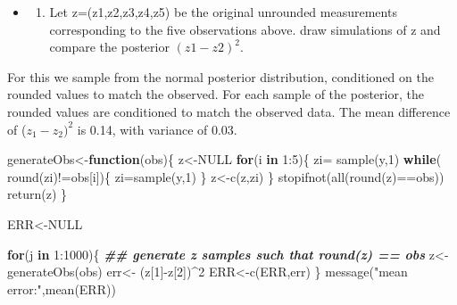 \documentclass[
]{book}
\newenvironment{Shaded}{\begin{snugshade}}{\end{snugshade}}
\newcommand{\ConstantTok}[1]{\textcolor[rgb]{0.00,0.00,0.00}{#1}}
\newcommand{\ControlFlowTok}[1]{\textcolor[rgb]{0.13,0.29,0.53}{\textbf{#1}}}
\newcommand{\DecValTok}[1]{\textcolor[rgb]{0.00,0.00,0.81}{#1}}
\newcommand{\DocumentationTok}[1]{\textcolor[rgb]{0.56,0.35,0.01}{\textbf{\textit{#1}}}}
\newcommand{\FunctionTok}[1]{\textcolor[rgb]{0.00,0.00,0.00}{#1}}
\newcommand{\NormalTok}[1]{#1}
\newcommand{\OtherTok}[1]{\textcolor[rgb]{0.56,0.35,0.01}{#1}}
\newcommand{\SpecialCharTok}[1]{\textcolor[rgb]{0.00,0.00,0.00}{#1}}
\newcommand{\StringTok}[1]{\textcolor[rgb]{0.31,0.60,0.02}{#1}}
\providecommand{\tightlist}{%
  \setlength{\itemsep}{0pt}\setlength{\parskip}{0pt}}
\theoremstyle{definition}
\theoremstyle{definition}
\theoremstyle{definition}
\theoremstyle{definition}
\theoremstyle{remark}
\begin{document}
\begin{itemize}
\item
  \begin{enumerate}
  \def\labelenumi{(\alph{enumi})}
  \setcounter{enumi}{3}
  \tightlist
  \item
    Let z=(z1,z2,z3,z4,z5) be the original unrounded measurements corresponding to the five observations above. draw simulations of z and compare the posterior \((z1-z2)^2\).
  \end{enumerate}
\end{itemize}

For this we sample from the normal posterior distribution, conditioned on the rounded values to match the observed. For each sample of the posterior, the rounded values are conditioned to match the observed data. The mean difference of (\(z_1-z_2)^2\) is 0.14, with variance of 0.03.

\begin{Shaded}
\begin{Highlighting}[]
\NormalTok{ generateObs}\OtherTok{\textless{}{-}}\ControlFlowTok{function}\NormalTok{(obs)\{}
\NormalTok{   z}\OtherTok{\textless{}{-}}\ConstantTok{NULL}
    \ControlFlowTok{for}\NormalTok{(i }\ControlFlowTok{in} \DecValTok{1}\SpecialCharTok{:}\DecValTok{5}\NormalTok{)\{}
\NormalTok{ zi}\OtherTok{=} \FunctionTok{sample}\NormalTok{(y,}\DecValTok{1}\NormalTok{)}
  \ControlFlowTok{while}\NormalTok{( }\FunctionTok{round}\NormalTok{(zi)}\SpecialCharTok{!=}\NormalTok{obs[i])\{}
\NormalTok{    zi}\OtherTok{=}\FunctionTok{sample}\NormalTok{(y,}\DecValTok{1}\NormalTok{)}
\NormalTok{  \}}
\NormalTok{  z}\OtherTok{\textless{}{-}}\FunctionTok{c}\NormalTok{(z,zi)}
\NormalTok{    \}}
   \FunctionTok{stopifnot}\NormalTok{(}\FunctionTok{all}\NormalTok{(}\FunctionTok{round}\NormalTok{(z)}\SpecialCharTok{==}\NormalTok{obs))}
   \FunctionTok{return}\NormalTok{(z)}
\NormalTok{ \}}
 
\NormalTok{ ERR}\OtherTok{\textless{}{-}}\ConstantTok{NULL}

 \ControlFlowTok{for}\NormalTok{(j }\ControlFlowTok{in} \DecValTok{1}\SpecialCharTok{:}\DecValTok{1000}\NormalTok{)\{}
   \DocumentationTok{\#\# generate z samples such that round(z) == obs}
\NormalTok{  z}\OtherTok{\textless{}{-}}\FunctionTok{generateObs}\NormalTok{(obs)}
\NormalTok{  err}\OtherTok{\textless{}{-}}\NormalTok{ (z[}\DecValTok{1}\NormalTok{]}\SpecialCharTok{{-}}\NormalTok{z[}\DecValTok{2}\NormalTok{])}\SpecialCharTok{\^{}}\DecValTok{2}
\NormalTok{ ERR}\OtherTok{\textless{}{-}}\FunctionTok{c}\NormalTok{(ERR,err)}
\NormalTok{ \}}
 \FunctionTok{message}\NormalTok{(}\StringTok{"mean error:"}\NormalTok{,}\FunctionTok{mean}\NormalTok{(ERR))}
\end{Highlighting}
\end{Shaded}
\end{document}
